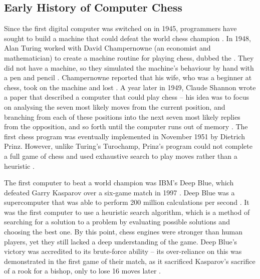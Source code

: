 \documentclass[%
 superscriptaddress,
showpacs,preprintnumbers,
 amsmath,
 amssymb,
 aps,
 pra,
showkeys,
onecolumn,
notitlepage,
11pt,
tightenlines      %
]{revtex4-1}
\begin{document}
\subsection{Early History of Computer Chess}
Since the first digital computer was switched on in 1945, programmers have sought to build a machine that could defeat the world chess champion \cite{earlyComputerChessHistory}. In 1948, Alan Turing worked with David Champernowne (an economist and mathematician) to create a machine routine for playing chess, dubbed the  \cite{copeland2005turing}. They did not have a machine, so they simulated the machine's behaviour by hand with a pen and pencil \cite{copeland2005turing}. Champernowne reported that his wife, who was a beginner at chess, took on the machine and lost \cite{copeland2005turing}. A year later in 1949, Claude Shannon wrote a paper that described a computer that could play chess -- his idea was to focus on analysing the seven most likely moves from the current position, and branching from each of these positions into the next seven most likely replies from the opposition, and so forth until the computer runs out of memory \cite{shannon1950xxii}. The first chess program was eventually implemented in November 1951 by Dietrich Prinz. However, unlike Turing's Turochamp, Prinz's program could not complete a full game of chess and used exhaustive search to play moves rather than a heuristic \cite{copeland2005turing}.

The first computer to beat a world champion was IBM's Deep Blue, which defeated Garry Kasparov over a six-game match in 1997 \cite{seirawan1997implications}. Deep Blue was a supercomputer that was able to perform 200 million calculations per second \cite{strogatz2018one}. It was the first computer to use a heuristic search algorithm, which is a method of searching for a solution to a problem by evaluating possible solutions and choosing the best one. By this point, chess engines were stronger than human players, yet they still lacked a deep understanding of the game. Deep Blue's victory was accredited to its brute-force ability -- its over-reliance on this was demonstrated in the first game of their match, as it sacrificed Kasparov's sacrifice of a rook for a bishop, only to lose 16 moves later \cite{strogatz2018one}.
\end{document}
